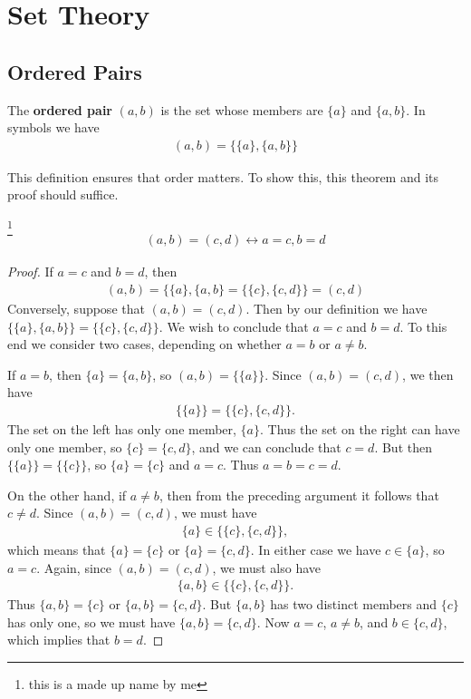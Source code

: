 \newpage
\chapter{Set Theory}

\section{Ordered Pairs}

\begin{definition}
	The \textbf{ordered pair} $(a,b)$ is the set whose members are $\{a\}$ and $\{a,b\}$. In symbols we have
	\begin{align*}
		(a,b) = \{\{a\}, \{a,b\}\}
	\end{align*}
\end{definition}

This definition ensures that order matters. To show this, this theorem and its proof should suffice.

\begin{theorem}
	\footnote{this is a made up name by me}
	\begin{align*}
		(a,b)=(c,d) \leftrightarrow a=c, b=d
	\end{align*}
\end{theorem}

\begin{proof}
	If $a=c$ and $b=d$, then 
	\begin{align*}
		(a,b)=\{\{a\}, \{a,b\} = \{\{c\}, \{c,d\}\}=(c,d)
	\end{align*}
	Conversely, suppose that $(a,b)=(c,d)$. Then by our definition we have $\{\{a\}, \{a,b\}\} = \{\{c\}, \{c,d\}\}$. We wish to conclude that $a=c$ and $b=d$. To this end we consider two cases, depending on whether $a=b$ or $a\neq b$.
	
	If $a=b$, then $\{a\} = \{a,b\}$, so $(a,b) = \{\{a\}\}$. Since $(a,b)=(c,d)$, we then have 
	\begin{align*}
		\{\{a\}\} = \{\{c\}, \{c,d\}\}.
	\end{align*}
	The set on the left has only one member, $\{a\}$. Thus the set on the right can have only one member, so $\{c\} = \{c,d\}$, and we can conclude that $c=d$. But then $\{\{a\}\} = \{\{c\}\}$, so $\{a\} = \{c\}$ and $a=c$. Thus $a=b=c=d$.
	
	On the other hand, if $a\neq b$, then from the preceding argument it follows that $c\neq d$. Since $(a,b) = (c,d)$, we must have 
	\begin{align*}
		\{a\} \in \{\{c\}, \{c,d\}\},
	\end{align*}
	which means that $\{a\} = \{c\}$ or $\{a\} = \{c,d\}$. In either case we have $c \in \{a\}$, so $a=c$. Again, since $(a,b)=(c,d)$, we must also have
	\begin{align*}
		\{a,b\} \in \{\{c\}, \{c,d\}\}.
	\end{align*}
	Thus $\{a,b\} = \{c\}$ or $\{a,b\} = \{c,d\}$. But $\{a,b\}$ has two distinct members and $\{c\}$ has only one, so we must have $\{a,b\} = \{c,d\}$. Now $a=c$, $a\neq b$, and $b\in \{c,d\}$, which implies that $b=d$. 
\end{proof}

